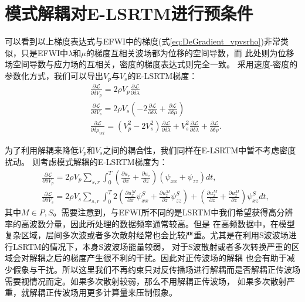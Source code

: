 \section{模式解耦对E-LSRTM进行预条件}
可以看到以上梯度表达式与EFWI中的梯度(式\ref{eq:DeGradient_vpvsrho})非常类似，只是EFWI中$\lambda$和$\mu$的梯度互相关波场都为位移的空间导数，而
此处则为位移场空间导数与应力场的互相关，密度的梯度表达式则完全一致。
采用速度-密度的参数化方式，我们可以导出$V_p$与$V_s$的E-LSRTM梯度：
\begin{equation}
\begin{split}
   & \frac{\partial\mathcal{L}}{\partial \delta V_p}=2\rho V_p\frac{\partial\mathcal{L}}{\partial \delta \lambda}\\
   & \frac{\partial\mathcal{L}}{\partial \delta V_s}=2\rho V_s(-2\frac{\partial\mathcal{L}}{\partial \delta \lambda}
	+\frac{\partial\mathcal{L}}{\partial \delta \mu})\\
   & \frac{\partial\mathcal{L}}{\partial \delta\rho_{vel}}=(V^2_p-2V^2_s)\frac{\partial\mathcal{L}}{\partial \delta \lambda}+V^2_s\frac{\partial\mathcal{L}}{\partial \delta \lambda}+\frac{\partial\mathcal{L}}{\partial \delta\rho}.
    \label{eq:Gradient_VpVsrho_LSRTM}
\end{split}
\end{equation}

为了利用解耦来降低$V_p$和$V_s$之间的耦合性，我们同样在E-LSRTM中暂不考虑密度扰动。
则考虑模式解耦的E-LSRTM梯度为：
\begin{equation}
\begin{split}
   & \frac{\partial\mathcal{L}}{\partial \delta V_p}=2\rho V_p\sum_{s,r}\int^T_{0}
	(\frac{\partial u_x}{\partial x}+\frac{\partial u_z}{\partial
	z})(\psi_{xx}+\psi_{zz})dt,\\
   & \frac{\partial\mathcal{L}}{\partial \delta V_s}=2\rho V_s\sum_{s,r}\int^T_{0}
	2(\frac{\partial u^M_x}{\partial x}\psi^S_{xx}+\frac{\partial u^M_z}{\partial z}\psi^S_{zz})+
	(\frac{\partial u^M_x}{\partial z}+\frac{\partial u^M_x}{\partial
	z})\psi^S_{xz}dt,
    \label{eq:Gradient_lambdamurho_LSRTM}
\end{split}
\end{equation}
其中$M\in{P,S}$。需要注意到，与EFWI所不同的是LSRTM中我们希望获得高分辨率的高波数分量，因此所处理的数据频率通常较高。但是
在高频数据中，在模型复杂区域，层间多次波或者多次散射经常也会比较严重。尤其是在利用S波波场进行LSRTM的情况下，本身S波波场能量较弱，
对于S波散射或者多次转换严重的区域会对解耦之后的梯度产生很不利的干扰。因此对正传波场的解耦
也会有助于减少假象与干扰。所以这里我们不再约束只对反传播场进行解耦而是否解耦正传波场需要视情况而定。如果多次散射较弱，那么不用解耦正传波场，
如果多次散射严重，就解耦正传波场用更多计算量来压制假象。

